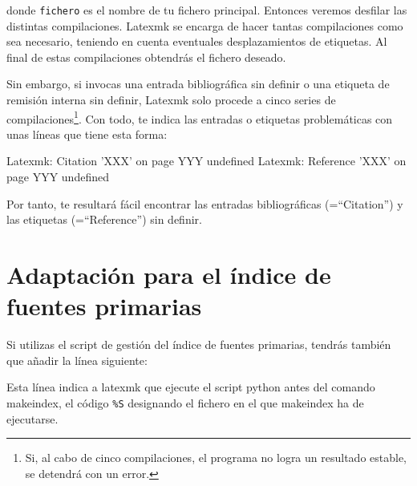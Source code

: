 donde \verb|fichero| es el nombre de tu fichero principal. Entonces veremos desfilar las distintas compilaciones. Latexmk se encarga de hacer tantas compilaciones como sea necesario, teniendo en cuenta eventuales desplazamientos de etiquetas. Al final de estas compilaciones obtendrás el fichero  deseado.

Sin embargo, si invocas una entrada bibliográfica sin definir o una etiqueta de remisión interna sin definir, Latexmk solo procede a cinco series de compilaciones\footnote{Si, al cabo de cinco compilaciones, el programa no logra un resultado estable, se detendrá con un error.}. Con todo, te indica las entradas o etiquetas problemáticas con unas líneas que tiene esta forma:
\begin{bashcode}
Latexmk: Citation 'XXX' on page YYY undefined 
Latexmk: Reference 'XXX' on page YYY undefined 
\end{bashcode}

Por tanto, te resultará fácil encontrar las entradas bibliográficas (=\enquote{Citation}) y las etiquetas (=\enquote{Reference}) sin definir.

\section{Adaptación para el índice de fuentes primarias}

Si utilizas el script de gestión del índice de fuentes primarias, tendrás también que añadir la línea siguiente:

Esta línea indica a latexmk que ejecute el script python antes del comando makeindex, el código \verb|%S| designando el fichero en el que makeindex ha de ejecutarse.

